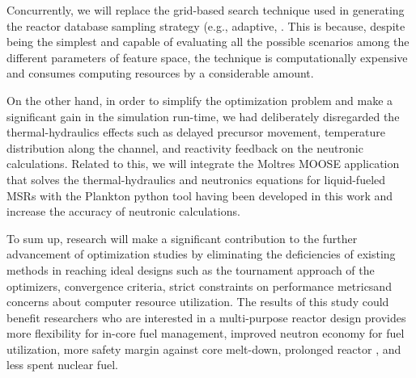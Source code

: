     \DIFaddend Concurrently, we will replace the grid-based search technique used in generating the reactor database \DIFdelbegin {}\DIFdelend \DIFaddbegin {}\DIFaddend sampling strategy (e.g., adaptive, \DIFdelbegin {}\DIFdelend \DIFaddbegin {}\DIFaddend . This is because, despite being the simplest and capable of evaluating all the possible scenarios among the different parameters of feature space, the \DIFaddbegin {}\DIFaddend technique is computationally expensive and consumes computing resources by a considerable amount. \DIFaddbegin {}

    \DIFaddend On the other hand, in order to simplify the optimization problem and make a significant gain in the simulation run-time, we had deliberately disregarded the thermal-hydraulics effects such as delayed precursor movement, temperature distribution along the channel, and reactivity feedback on the neutronic calculations. Related to this, we will integrate the Moltres MOOSE application that solves the thermal-hydraulics and neutronics equations for liquid-fueled \gls{MSR}s with the Plankton python tool having been developed in this work and increase the accuracy of neutronic calculations.

    To sum up, \DIFdelbegin {}%
\DIFdel{/}%
\DIFdelend \DIFaddbegin {}\DIFaddend research will make a significant contribution to the further advancement of optimization studies by eliminating the deficiencies of \DIFaddbegin {}\DIFaddend existing methods in reaching ideal designs such as the tournament approach of the optimizers, convergence criteria, strict constraints on performance metrics\DIFaddbegin \DIFadd{, }\DIFaddend and concerns about computer resource utilization. The results of this study could benefit researchers who are interested in a multi-purpose reactor design \DIFdelbegin {}\DIFdelend \DIFaddbegin {}\DIFaddend provides more flexibility for in-core fuel management, improved neutron economy for fuel utilization, more safety margin against core melt-down, prolonged reactor \DIFdelbegin {}\DIFdelend \DIFaddbegin {}\DIFaddend , and less spent nuclear fuel.
